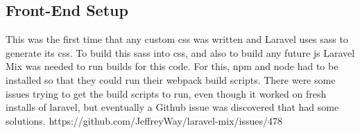 \documentclass{article}
\begin{document}
\subsection{Front-End Setup}
This was the first time that any custom css was written and Laravel uses sass to generate its css. To build this sass into css, and also to build any future js Laravel Mix was needed to run builds for this code. For this, npm and node had to be installed so that they could run their webpack build scripts. There were some issues trying to get the build scripts to run, even though it worked on fresh installs of laravel, but eventually a Github issue was discovered that had some solutions.
https://github.com/JeffreyWay/laravel-mix/issues/478

%
%
\end{document}
